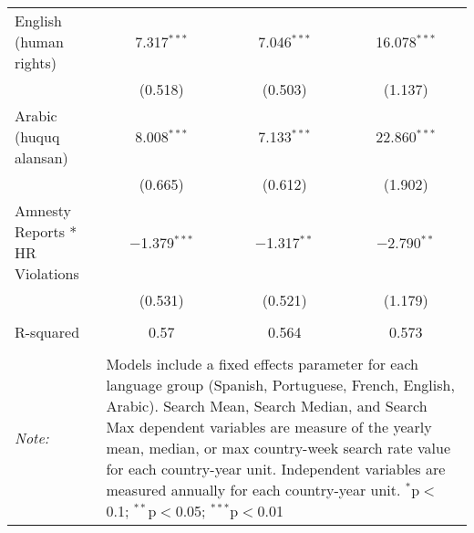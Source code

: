 \begin{table}[!htbp]
\begin{tabular}{@{\extracolsep{5pt}}lccc}
  English (human rights) & 7.317$^{***}$ & 7.046$^{***}$ & 16.078$^{***}$ \\ 
  & (0.518) & (0.503) & (1.137) \\ 
  Arabic (huquq alansan) & 8.008$^{***}$ & 7.133$^{***}$ & 22.860$^{***}$ \\ 
  & (0.665) & (0.612) & (1.902) \\ 
  Amnesty Reports * HR Violations & $-$1.379$^{***}$ & $-$1.317$^{**}$ & $-$2.790$^{**}$ \\ 
  & (0.531) & (0.521) & (1.179) \\ 
 \hline \\[-1.8ex] 
R-squared  & 0.57 & 0.564 & 0.573 \\ 
\hline 
\hline \\[-1.8ex] 
\textit{Note:}  & \multicolumn{3}{l}{\parbox[t]{8cm}{Models include a fixed effects parameter for each language group (Spanish, Portuguese, French, English, Arabic). Search Mean, Search Median, and Search Max dependent variables are measure of the yearly mean, median, or max country-week search rate value for each country-year unit. Independent variables are measured annually for each country-year unit. $^{*}$p$<$0.1; $^{**}$p$<$0.05; $^{***}$p$<$0.01}} \\ 
\end{tabular} 
\end{table} 
